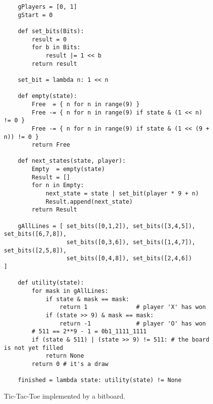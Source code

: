\begin{figure}[!ht]
\centering
\begin{verbatim}
    gPlayers = [0, 1]
    gStart = 0
    
    def set_bits(Bits):
        result = 0
        for b in Bits:
            result |= 1 << b
        return result

    set_bit = lambda n: 1 << n

    def empty(state):
        Free  = { n for n in range(9) }
        Free -= { n for n in range(9) if state & (1 << n) != 0 }
        Free -= { n for n in range(9) if state & (1 << (9 + n)) != 0 }
        return Free

    def next_states(state, player):
        Empty  = empty(state)
        Result = []
        for n in Empty:
            next_state = state | set_bit(player * 9 + n)
            Result.append(next_state)
        return Result

    gAllLines = [ set_bits([0,1,2]), set_bits([3,4,5]), set_bits([6,7,8]), 
                  set_bits([0,3,6]), set_bits([1,4,7]), set_bits([2,5,8]), 
                  set_bits([0,4,8]), set_bits([2,4,6])                     ]

    def utility(state):
        for mask in gAllLines:
            if state & mask == mask:
                return 1              # player 'X' has won
            if (state >> 9) & mask == mask:
                return -1             # player 'O' has won
        # 511 == 2**9 - 1 = 0b1_1111_1111  
        if (state & 511) | (state >> 9) != 511: # the board is not yet filled
            return None
        return 0 # it's a draw
    
    finished = lambda state: utility(state) != None
\end{verbatim}
\vspace*{-0.3cm}
\caption{Tic-Tac-Toe implemented by a bitboard.}
\label{fig:Tic-Tac-Toe-Bitboard.ipynb}
\end{figure}
\FloatBarrier

